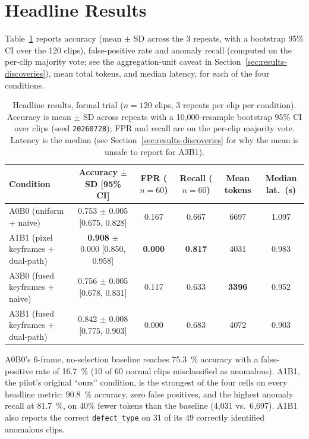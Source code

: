 \section{Headline Results}
\label{sec:results-headline}
Table~\ref{tab:headline-results} reports accuracy (mean $\pm$ SD across the 3 repeats, with a bootstrap 95\% CI over the 120 clips), false-positive rate and anomaly recall (computed on the per-clip majority vote; see the aggregation-unit caveat in Section~\ref{sec:results-discoveries}), mean total tokens, and median latency, for each of the four conditions.

\begin{table}[htbp]
\centering
\caption[Headline per-condition results, formal trial ($n=120$)]{Headline results, formal trial ($n=120$ clips, 3 repeats per clip per condition). Accuracy is mean $\pm$ SD across repeats with a 10,000-resample bootstrap 95\% CI over clips (seed \texttt{20260728}); FPR and recall are on the per-clip majority vote. Latency is the median (see Section~\ref{sec:results-discoveries} for why the mean is unsafe to report for A3B1).}
\label{tab:headline-results}
\small
\begin{tabular}{@{}lccccc@{}}
\toprule
Condition & Accuracy $\pm$ SD [95\% CI] & FPR ($n{=}60$) & Recall ($n{=}60$) & Mean tokens & Median lat.\ (s) \\
\midrule
A0B0 (uniform + naive)             & 0.753 $\pm$ 0.005 [0.675, 0.828] & 0.167 & 0.667 & 6697 & 1.097 \\
A1B1 (pixel keyframes + dual-path) & \textbf{0.908} $\pm$ 0.000 [0.850, 0.958] & \textbf{0.000} & \textbf{0.817} & 4031 & 0.983 \\
A3B0 (fused keyframes + naive)     & 0.756 $\pm$ 0.005 [0.678, 0.831] & 0.117 & 0.633 & \textbf{3396} & 0.952 \\
A3B1 (fused keyframes + dual-path) & 0.842 $\pm$ 0.008 [0.775, 0.903] & 0.000 & 0.683 & 4072 & 0.903 \\
\bottomrule
\end{tabular}
\end{table}

A0B0's 6-frame, no-selection baseline reaches \SI{75.3}{\percent} accuracy with a false-positive rate of \SI{16.7}{\percent} (10 of 60 normal clips misclassified as anomalous). A1B1, the pilot's original ``ours'' condition, is the strongest of the four cells on every headline metric: \SI{90.8}{\percent} accuracy, zero false positives, and the highest anomaly recall at \SI{81.7}{\percent}, on 40\% fewer tokens than the baseline (4{,}031 vs.\ 6{,}697). A1B1 also reports the correct \texttt{defect\_type} on 31 of its 49 correctly identified anomalous clips.

